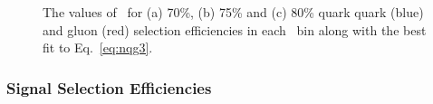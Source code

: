 \begin{figure}[p]
 \centering

\caption{ The values of \ntrk\ for  (a) 70\%,  (b) 75\%  and (c) 80\% quark  quark (blue) and gluon (red) 
selection efficiencies in each \pT\ bin along with the best fit to Eq.~\ref{eq:nqg3}.
 \label{fig:qg_selection_curves}}
\end{figure}


\subsubsection{Signal Selection Efficiencies}


